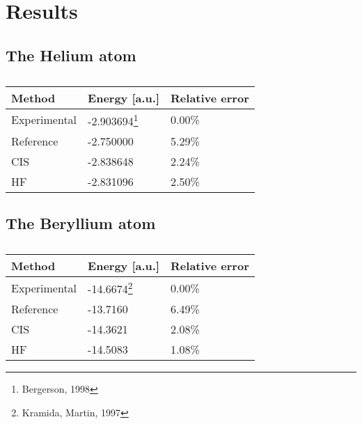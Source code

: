 \section{Results} \label{sec:results}


\subsection{The Helium atom}
\begin{table} [H]
	\caption{}
	\begin{tabularx}{\textwidth}{X|X|X} \hline\hline
		\textbf{Method}&\textbf{Energy} [a.u.]&\textbf{Relative error}\\ \hline
		Experimental & -2.903694\footnote{Bergerson, 1998} & 0.00\%  \\
		Reference & -2.750000 & 5.29\% \\
		CIS & -2.838648 &  2.24\% \\
		HF & -2.831096 & 2.50\% \\ \hline\hline
	\end{tabularx}
\end{table}

\subsection{The Beryllium atom}

\begin{table} [H]
	\caption{}
	\begin{tabularx}{\textwidth}{X|X|X} \hline\hline
		\textbf{Method}&\textbf{Energy} [a.u.]&\textbf{Relative error}\\ \hline
		Experimental & -14.6674\footnote{Kramida, Martin, 1997} & 0.00\%  \\
		Reference & -13.7160 & 6.49\% \\
		CIS & -14.3621 &  2.08\% \\
		HF & -14.5083 & 1.08\% \\ \hline\hline
	\end{tabularx}
\end{table}

\iffalse
\begin{figure} [H]%
	\centering
	\subfloat[Lambda vs. R2-score]{{\texttt{[image: ../plots/lambda\_R2score.png]} }}%
	\subfloat[Variance vs. R2-score]{{\texttt{[image: ../plots/var\_R2score.png]} }}
	\caption{R$^2$-score plotted as a function of the penalty $\lambda$ (a) and as a function of the noise (b). $\lambda\in[10^{-8},10^2]$ in (a) and $\sigma^2\in[10^{-6},10^{-0.7}]$ in (b). The other parameters used were $\lambda=1e-5$ (penalty, was held constant for (b) only), $\eta=1e-4$ (learning rate), $niter=1e5$ (number of iterations) and $\mathcal{N}(0, \sigma^2=0.1)$ (noise, was held constant for (a) only).}%
	\label{fig:R2_scores}
\end{figure}
\fi 


